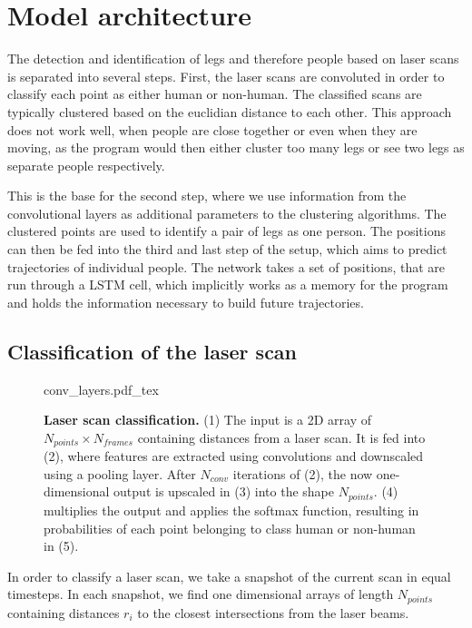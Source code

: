 \section{Model architecture}

The detection and identification of legs and therefore people based on laser scans is separated into several steps. First, the laser scans are convoluted in order to classify each point as either human or non-human. The classified scans are typically clustered based on the euclidian distance to each other. This approach does not work well, when people are close together or even when they are moving, as the program would then either cluster too many legs or see two legs as separate people respectively.

This is the base for the second step, where we use information from the convolutional layers as additional parameters to the clustering algorithms.
The clustered points are used to identify a pair of legs as one person. The positions can then be fed into the third and last step of the setup, which aims to predict trajectories of individual people. The network takes a set of positions, that are run through a LSTM cell, which implicitly works as a memory for the program and holds the information necessary to build future trajectories.

\subsection{Classification of the laser scan}

\begin{figure}
\def\svgwidth{0.4 \textwidth}
\small
{conv_layers.pdf_tex}
\caption{\textbf{Laser scan classification.} (1) The input is a 2D array of $N_{points} \times N_{frames}$ containing distances from a laser scan. It is fed into (2), where features are extracted using convolutions and downscaled using a pooling layer. After $N_{conv}$ iterations of (2), the now one-dimensional output is upscaled in (3) into the shape $N_{points}$. (4) multiplies the output and applies the softmax function, resulting in probabilities of each point belonging to class human or non-human in (5).}
\label{fig:laser_classification}
\end{figure}

In order to classify a laser scan, we take a snapshot of the current scan in equal timesteps. In each snapshot, we find one dimensional arrays of length $N_{points}$ containing distances $r_i$ to the closest intersections from the laser beams.


